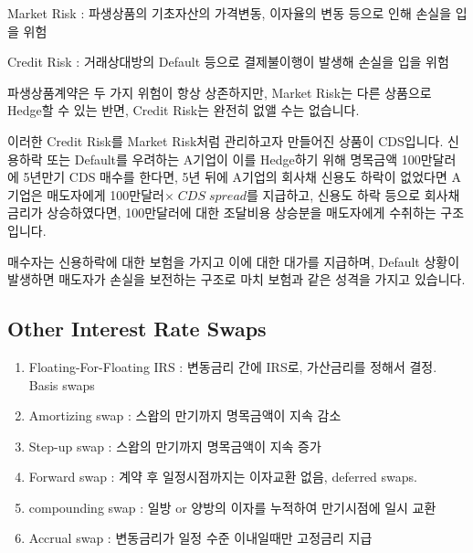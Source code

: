 \documentclass[
  letterpaper,
  DIV=11,
  numbers=noendperiod]{scrreprt}
\providecommand{\tightlist}{%
  \setlength{\itemsep}{0pt}\setlength{\parskip}{0pt}}\usepackage{longtable,booktabs,array}
\begin{document}
\begin{tcolorbox}[enhanced jigsaw, titlerule=0mm, bottomtitle=1mm, left=2mm, title=\textcolor{quarto-callout-caution-color}{\faFire}\hspace{0.5em}{Market Risk vs.~Credit Risk}, toptitle=1mm, bottomrule=.15mm, colframe=quarto-callout-caution-color-frame, breakable, opacityback=0, rightrule=.15mm, opacitybacktitle=0.6, coltitle=black, colback=white, arc=.35mm, colbacktitle=quarto-callout-caution-color!10!white, toprule=.15mm, leftrule=.75mm]

Market Risk : 파생상품의 기초자산의 가격변동, 이자율의 변동 등으로 인해
손실을 입을 위험

Credit Risk : 거래상대방의 Default 등으로 결제불이행이 발생해 손실을
입을 위험

파생상품계약은 두 가지 위험이 항상 상존하지만, Market Risk는 다른
상품으로 Hedge할 수 있는 반면, Credit Risk는 완전히 없앨 수는 없습니다.

\end{tcolorbox}

이러한 Credit Risk를 Market Risk처럼 관리하고자 만들어진 상품이
CDS입니다. 신용하락 또는 Default를 우려하는 A기업이 이를 Hedge하기 위해
명목금액 100만달러에 5년만기 CDS 매수를 한다면, 5년 뒤에 A기업의 회사채
신용도 하락이 없었다면 A기업은 매도자에게
100만달러\(\times\;CDS\;spread\)를 지급하고, 신용도 하락 등으로 회사채
금리가 상승하였다면, 100만달러에 대한 조달비용 상승분을 매도자에게
수취하는 구조입니다.

매수자는 신용하락에 대한 보험을 가지고 이에 대한 대가를 지급하며,
Default 상황이 발생하면 매도자가 손실을 보전하는 구조로 마치 보험과 같은
성격을 가지고 있습니다.

\subsection*{Other Interest Rate Swaps}\label{other-interest-rate-swaps}

\begin{enumerate}
\def\labelenumi{(\arabic{enumi})}
\tightlist
\item
  Floating-For-Floating IRS : 변동금리 간에 IRS로, 가산금리를 정해서
  결정. Basis swaps
\item
  Amortizing swap : 스왑의 만기까지 명목금액이 지속 감소
\item
  Step-up swap : 스왑의 만기까지 명목금액이 지속 증가
\item
  Forward swap : 계약 후 일정시점까지는 이자교환 없음, deferred swaps.
\item
  compounding swap : 일방 or 양방의 이자를 누적하여 만기시점에 일시 교환
\item
  Accrual swap : 변동금리가 일정 수준 이내일때만 고정금리 지급
\end{enumerate}
\end{document}
